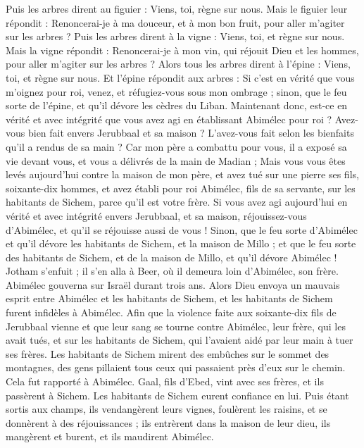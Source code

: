 \begin{multicols}{2}
Puis les arbres dirent au figuier : Viens, toi, règne sur nous.
Mais le figuier leur répondit : Renoncerai-je à ma douceur, et à mon bon fruit, pour aller m'agiter sur les arbres ?
Puis les arbres dirent à la vigne : Viens, toi, et règne sur nous.
Mais la vigne répondit : Renoncerai-je à mon vin, qui réjouit Dieu et les hommes, pour aller m'agiter sur les arbres ?
Alors tous les arbres dirent à l'épine : Viens, toi, et règne sur nous.
Et l'épine répondit aux arbres : Si c'est en vérité que vous m'oignez pour roi, venez, et réfugiez-vous sous mon ombrage ; sinon, que le feu sorte de l'épine, et qu'il dévore les cèdres du Liban.
Maintenant donc, est-ce en vérité et avec intégrité que vous avez agi en établissant Abimélec pour roi ? Avez-vous bien fait envers Jerubbaal et sa maison ? L'avez-vous fait selon les bienfaits qu'il a rendus de sa main ?
Car mon père a combattu pour vous, il a exposé sa vie devant vous, et vous a délivrés de la main de Madian ;
Mais vous vous êtes levés aujourd'hui contre la maison de mon père, et avez tué sur une pierre ses fils, soixante-dix hommes, et avez établi pour roi Abimélec, fils de sa servante, sur les habitants de Sichem, parce qu'il est votre frère.
Si vous avez agi aujourd'hui en vérité et avec intégrité envers Jerubbaal, et sa maison, réjouissez-vous d'Abimélec, et qu'il se réjouisse aussi de vous !
Sinon, que le feu sorte d'Abimélec et qu'il dévore les habitants de Sichem, et la maison de Millo ; et que le feu sorte des habitants de Sichem, et de la maison de Millo, et qu'il dévore Abimélec !
Jotham s'enfuit ; il s'en alla à Beer, où il demeura loin d'Abimélec, son frère.
Abimélec gouverna sur Israël durant trois ans.
Alors Dieu envoya un mauvais esprit entre Abimélec et les habitants de Sichem, et les habitants de Sichem furent infidèles à Abimélec.
Afin que la violence faite aux soixante-dix fils de Jerubbaal vienne et que leur sang se tourne contre Abimélec, leur frère, qui les avait tués, et sur les habitants de Sichem, qui l'avaient aidé par leur main à tuer ses frères.
Les habitants de Sichem mirent des embûches sur le sommet des montagnes, des gens pillaient tous ceux qui passaient près d'eux sur le chemin. Cela fut rapporté à Abimélec.
Gaal, fils d'Ebed, vint avec ses frères, et ils passèrent à Sichem. Les habitants de Sichem eurent confiance en lui.
Puis étant sortis aux champs, ils vendangèrent leurs vignes, foulèrent les raisins, et se donnèrent à des réjouissances ; ils entrèrent dans la maison de leur dieu, ils mangèrent et burent, et ils maudirent Abimélec.

\end{multicols}
